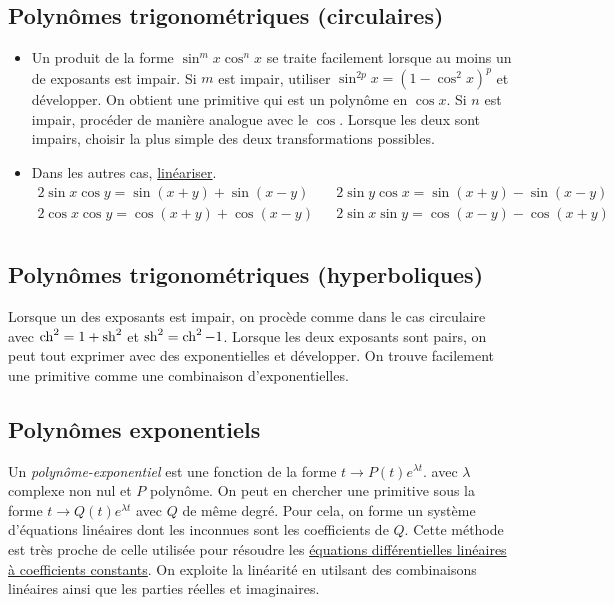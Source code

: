 \subsection{Polynômes trigonométriques (circulaires)}
\begin{itemize}
 \item Un produit de la forme $\sin^mx\cos^nx$ se traite facilement lorsque au moins un de exposants est impair.\newline
Si $m$ est impair, utiliser $\sin^{2p}x = (1-\cos^2x)^p$ et développer. On obtient une primitive qui est un polynôme en $\cos x$.\newline
Si $n$ est impair, procéder de manière analogue avec le $\cos$. Lorsque les deux sont impairs, choisir la plus simple des deux transformations possibles.
\item Dans les autres cas, \href{\baseurl C2004.pdf}{linéariser}.
\begin{align*}
 2\sin x \cos y = \sin(x+y)+\sin(x-y) & & 2\sin y \cos x = \sin(x+y) - \sin(x-y) \\
2\cos x \cos y = \cos(x+y)+\cos(x-y) & & 2\sin x \sin y = \cos(x-y) - \cos(x+y) \\
\end{align*}
\end{itemize}

\subsection{Polynômes trigonométriques (hyperboliques)}
Lorsque un des exposants est impair, on procède comme dans le cas circulaire avec $\mathop{\mathrm{ch}}^2 = 1 +\mathop{\mathrm{sh}}^2$ et $\mathop{\mathrm{sh}}^2 = \mathop{\mathrm{ch}}^2 -1$.\newline
Lorsque les deux exposants sont pairs, on peut tout exprimer avec des exponentielles et développer. On trouve facilement une primitive comme une combinaison d'exponentielles.

\subsection{Polynômes exponentiels}
Un \emph{polynôme-exponentiel} est une fonction de la forme $t\rightarrow P(t)e^{\lambda t}$. avec $\lambda$ complexe non nul et $P$ polynôme.\newline
On peut en chercher une primitive sous la forme $t\rightarrow Q(t)e^{\lambda t}$ avec $Q$ de même degré. Pour cela, on forme un système d'équations linéaires dont les inconnues sont les coefficients de $Q$. Cette méthode est très proche de celle utilisée pour résoudre les \href{\baseurl C1616.pdf}{équations différentielles linéaires à coefficients constants}. On exploite la linéarité en utilsant des combinaisons linéaires ainsi que les parties réelles et imaginaires.
